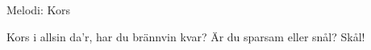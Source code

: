 \begin{song}

\begin{songmeta}
Melodi: Kors
\end{songmeta}

\begin{songtext}
Kors i allsin da'r,
har du brännvin kvar?
Är du sparsam eller snål?
Skål!
\end{songtext}
\end{song}
